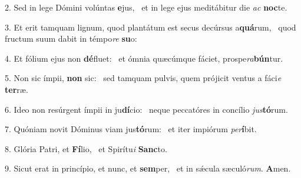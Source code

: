 2. Sed in lege Dómini volúntas \textbf{e}jus, \ast\  et in lege ejus meditábitur die \textit{ac} \textbf{noc}te.\

3. Et erit tamquam lignum, quod plantátum est secus decúrsus a\textbf{quá}rum, \ast\  quod fructum suum dabit in témpo\textit{re} \textbf{su}o:\

4. Et fólium ejus non \textbf{dé}fluet: \ast\  et ómnia quæcúmque fáciet, prospe\textit{ra}\textbf{bún}tur.\

5. Non sic ímpii, \textbf{non} sic: \ast\  sed tamquam pulvis, quem prójicit ventus a fáci\textit{e} \textbf{ter}ræ.\

6. Ideo non resúrgent ímpii in ju\textbf{dí}cio: \ast\  neque peccatóres in concílio \textit{jus}\textbf{tó}rum.\

7. Quóniam novit Dóminus viam jus\textbf{tó}rum: \ast\  et iter impiórum \textit{per}\textbf{í}bit.\

8. Glória Patri, et \textbf{Fí}lio, \ast\  et Spirítu\textit{i} \textbf{Sanc}to.\

9. Sicut erat in princípio, et nunc, et \textbf{sem}per, \ast\  et in sǽcula sæculó\textit{rum}. \textbf{A}men.\

